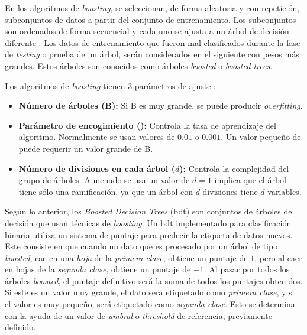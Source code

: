 En los algoritmos de \emph{boosting}, se seleccionan, de forma aleatoria y con repetición, subconjuntos de datos a partir del conjunto de entrenamiento. Los subconjuntos son ordenados de forma secuencial y cada uno se ajusta a un árbol de decisión diferente \cite{James}. Los datos de entrenamiento que fueron mal clasificados durante la fase de \textit{testing} o prueba de un árbol, serán considerados en el siguiente con pesos más grandes. Estos árboles son conocidos como árboles \emph{boosted} o \emph{boosted trees}. 
%

Los algoritmos de \emph{boosting} tienen 3 parámetros de ajuste \cite{James}:
\begin{itemize}
    \item \textbf{Número de árboles (B):} Si B es muy grande, se puede producir \emph{overfitting}.
    \item \textbf{Parámetro de encogimiento (\lambda):} Controla la tasa de aprendizaje del algoritmo. Normalmente se usan valores de $0.01$ o $0.001$. Un valor pequeño de \lambda puede requerir un valor grande de B.
    \item \textbf{Número de divisiones en cada árbol ($d$):} Controla la complejidad del grupo de árboles. A menudo se usa un valor de $d=1$ implica que el árbol tiene sólo una ramificación, ya que un árbol con $d$ divisiones tiene $d$ variables.
\end{itemize}
%
Según lo anterior, los \emph{Boosted Decision Trees} (\acrshort{bdt}) son conjuntos de árboles de decisión que usan técnicas de \emph{boosting}. 
%
Un \acrshort{bdt} implementado para clasificación binaria utiliza un sistema de puntaje para predecir la etiqueta de datos nuevos. 
%
Este consiste en que cuando un dato que es procesado por un árbol de tipo \emph{boosted}, cae en una \textit{hoja} de la \textit{primera clase}, obtiene un puntaje de $1$, pero al caer en hojas de la \textit{segunda clase}, obtiene un puntaje de $-1$. Al pasar por todos los árboles \emph{boosted}, el puntaje definitivo será la suma de todos los puntajes obtenidos. Si este es un valor muy grande, el dato será etiquetado como \textit{primera clase}, y si el valor es muy pequeño, será etiquetado como \textit{segunda clase}. Esto se determina con la ayuda de un valor de \textit{umbral} o \emph{threshold} de referencia, previamente definido. 
%
%
